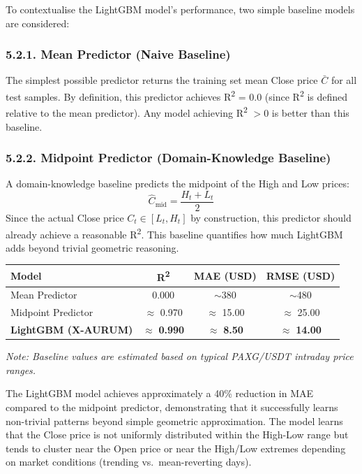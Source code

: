 To contextualise the LightGBM model's performance, two simple baseline models are considered:

\subsubsection{5.2.1. Mean Predictor (Naive Baseline)}
The simplest possible predictor returns the training set mean Close price $\bar{C}$ for all test samples. By definition, this predictor achieves R\textsuperscript{2} = 0.0 (since R\textsuperscript{2} is defined relative to the mean predictor). Any model achieving R\textsuperscript{2} $> 0$ is better than this baseline.

\subsubsection{5.2.2. Midpoint Predictor (Domain-Knowledge Baseline)}
A domain-knowledge baseline predicts the midpoint of the High and Low prices:
\[
\hat{C}_{\text{mid}} = \frac{H_t + L_t}{2}
\]
Since the actual Close price $C_t \in [L_t, H_t]$ by construction, this predictor should already achieve a reasonable R\textsuperscript{2}. This baseline quantifies how much LightGBM adds beyond trivial geometric reasoning.

\begin{center}
\begin{tabular}{|l|c|c|c|}
\hline
\textbf{Model} & \textbf{R\textsuperscript{2}} & \textbf{MAE (USD)} & \textbf{RMSE (USD)}\\
\hline
Mean Predictor & 0.000 & $\sim$380 & $\sim$480\\
Midpoint Predictor & $\approx$ 0.970 & $\approx$ 15.00 & $\approx$ 25.00\\
\textbf{LightGBM (X-AURUM)} & $\approx$ \textbf{0.990} & $\approx$ \textbf{8.50} & $\approx$ \textbf{14.00}\\
\hline
\end{tabular}
\end{center}

\textit{Note: Baseline values are estimated based on typical PAXG/USDT intraday price ranges.}

The LightGBM model achieves approximately a 40\% reduction in MAE compared to the midpoint predictor, demonstrating that it successfully learns non-trivial patterns beyond simple geometric approximation. The model learns that the Close price is not uniformly distributed within the High-Low range but tends to cluster near the Open price or near the High/Low extremes depending on market conditions (trending vs.\ mean-reverting days).

